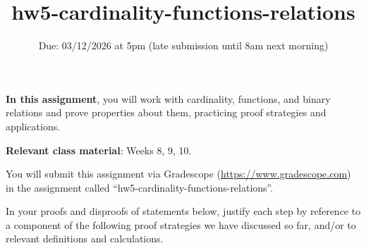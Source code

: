 


\title{hw5-cardinality-functions-relations}
\date{Due: 03/12/2026 at 5pm (late submission until 8am next morning)}

\maketitle
\thispagestyle{fancy}


{\bf In this assignment},  you will work with cardinality, functions, and binary relations and prove 
properties about them, practicing proof strategies and applications.


{\bf Relevant class material}: Weeks 8, 9, 10.

You will submit this assignment via Gradescope
(\href{https://www.gradescope.com}{https://www.gradescope.com}) 
in the assignment called ``hw5-cardinality-functions-relations''.

\instructions

In your proofs and disproofs of statements below, justify each  step
by reference to  a component of the  following proof  strategies
we  have discussed so far, and/or to relevant definitions and calculations.

\vspace{-10pt}

